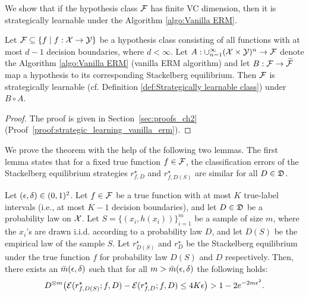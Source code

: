We show that if the hypothesis class $\mathcal{F}$ has finite VC dimension, then it is strategically learnable under the Algorithm \ref{algo:Vanilla ERM}.

\begin{thm}\label{thm:Startegic learning for vanilla ERM}
Let $\mathcal{F} \subseteq \{ f \mid f: \mathcal{X} \rightarrow \mathcal{Y} \}$ be a hypothesis class consisting of all functions with at most $d-1$ decision boundaries, where $d <\infty$. Let $A: \cup_{n=1}^\infty (\mathcal{X} \times \mathcal{Y})^n \rightarrow \mathcal{F}$ denote the Algorithm \ref{algo:Vanilla ERM} (vanilla ERM algorithm) and let $B: \mathcal{F} \rightarrow \widetilde{\mathcal{F}}$ map a hypothesis to its corresponding Stackelberg equilibrium. Then $\mathcal{F}$ is strategically learnable (cf. Definition \ref{def:Strategically learnable class}) under $B \circ A$.
\end{thm}

\begin{proof} The proof is given in Section~\ref{sec:proofs_ch2} (Proof~\ref{proof:strategic_learning_vanilla_erm}).
\end{proof}

We prove the theorem with the help of the following two lemmas. The first lemma states that for a fixed true function $f \in \mathcal{F}$, the classification errors of the Stackelberg equilibrium strategies $r^\star_{f,D}$ and $r^\star_{f,D(S)}$ are similar for all $D \in \mathfrak{D}$.

\begin{lem}\label{lem:same true function}
Let $(\epsilon, \delta) \in (0,1)^2$. Let $f \in \mathcal{F}$ be a true function with at most $K$ true-label intervals (i.e., at most $K-1$ decision boundaries), and let $D \in \mathfrak{D}$ be a probability law on $\mathcal{X}$. Let $S = \{(x_i, h(x_i))\}_{i=1}^m$ be a sample of size $m$, where the $x_i$'s are drawn i.i.d. according to a probability law $D$, and let $D(S)$ be the empirical law of the sample $S$. Let $r^{\star}_{D(S)}$ and $r^{\star}_{D}$ be the Stackelberg equilibrium under the true function $f$ for probability law $D(S)$ and $D$ respectively. Then, there exists an $\bar{m}(\epsilon,\delta)$ such that for all $m > \bar{m}(\epsilon,\delta)$ the following holds:
    \begin{equation*}
        D^{\otimes m}\big(\mathcal{E}(r^\star_{f,D(S)};f, D) - \mathcal{E}(r^\star_{f,D};f, D) \le 4K\epsilon\big) > 1 - 2e^{-2m\epsilon^2}.
    \end{equation*}
\end{lem}

